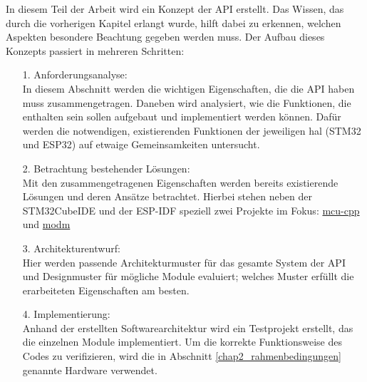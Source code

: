 In diesem Teil der Arbeit wird ein Konzept der API erstellt.
Das Wissen, das durch die vorherigen Kapitel erlangt wurde, hilft dabei zu erkennen, welchen Aspekten besondere Beachtung gegeben werden muss.
Der Aufbau dieses Konzepts passiert in mehreren Schritten:
\begin{itemize}
	\item [1.]  Anforderungsanalyse: \\In diesem Abschnitt werden die wichtigen Eigenschaften, die die API haben muss zusammengetragen. Daneben wird analysiert, wie die Funktionen, die enthalten sein sollen aufgebaut und implementiert werden können. Dafür werden die notwendigen, existierenden Funktionen der jeweiligen \gls{hal} (STM32 und ESP32) auf etwaige Gemeinsamkeiten untersucht.
 	\item [2.] 	Betrachtung bestehender Lösungen: \\Mit den zusammengetragenen Eigenschaften werden bereits existierende Lösungen und deren Ansätze betrachtet. Hierbei stehen  neben der STM32CubeIDE und der ESP-IDF speziell zwei Projekte im Fokus: \href{https://github.com/yh-sb/mcu-cpp.git}{mcu-cpp}\cite{github_mcu_cpp} und \href{https://github.com/modm-io/modm.git}{modm}\cite{github_modm}
	\item [3.] Architekturentwurf: \\Hier werden passende Architekturmuster für das gesamte System der API und Designmuster für mögliche Module evaluiert; welches Muster erfüllt die erarbeiteten Eigenschaften am besten.
	\item [4.] Implementierung: \\Anhand der erstellten Softwarearchitektur wird ein Testprojekt erstellt, das die einzelnen Module implementiert. Um die korrekte Funktionsweise des Codes zu verifizieren, wird die in Abschnitt \ref{chap2_rahmenbedingungen} genannte Hardware verwendet. 
\end{itemize}

